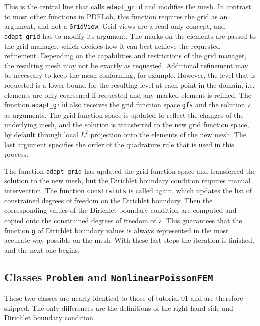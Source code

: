 \documentclass[a4paper,12pt]{article}
\begin{document}

This is the central line that calls \lstinline{adapt_grid} and modifies the mesh. In contrast
to most other functions in PDELab, this function requires the grid as an argument, and not a
\lstinline{GridView}. Grid views are a read only concept, and \lstinline{adapt_grid} has to
modify its argument. The marks on the elements are passed to the grid manager, which decides
how it can best achieve the requested refinement. Depending on the capabilities and
restrictions of the grid manager, the resulting mesh may not be exactly as requested.
Additional refinement may be necessary to keep the mesh conforming, for example. However, the
level that is requested is a lower bound for the resulting level at each point in the domain,
i.e. elements are only coarsened if requested and any marked element is refined. The function
\lstinline{adapt_grid} also receives the grid function space \lstinline{gfs} and the solution
\lstinline{z} as arguments. The grid function space is updated to reflect the changes of the
underlying mesh, and the solution is transferred to the new grid function space, by default
through local $L^2$ projection onto the elements of the new mesh. The last argument specifies
the order of the quadrature rule that is used in this process.


The function \lstinline{adapt_grid} has updated the grid function space and transferred the
solution to the new mesh, but the Dirichlet boundary condition requires manual intervention.
The function \lstinline{constraints} is called again, which updates the list of constrained
degrees of freedom on the Dirichlet boundary. Then the corresponding values of the Dirichlet
boundary condition are computed and copied onto the constrained degrees of freedom of
\lstinline{z}. This guarantees that the function \lstinline{g} of Dirichlet boundary values
is always represented in the most accurate way possible on the mesh. With these last steps
the iteration is finished, and the next one begins.

\subsection{Classes \lstinline{Problem} and \lstinline{NonlinearPoissonFEM}}

These two classes are nearly identical to those of tutorial 01 and are therefore skipped.
The only differences are the definitions of the right hand side and Dirichlet boundary
condition.
\end{document}
